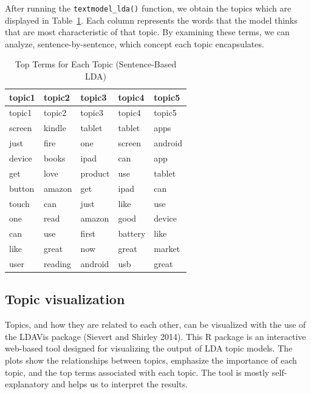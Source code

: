 After running the \texttt{textmodel\_lda()} function, we obtain the topics which are displayed in
Table~\ref{tbl-sentence_based_lda2}. Each column represents the words
that the model thinks that are most characteristic of that
topic. By examining these terms, we can analyze, sentence-by-sentence, which concept each topic
encapsulates.

\begin{longtable}[]{@{}lllll@{}}
\caption{Top Terms for Each Topic (Sentence-Based
LDA)}\label{tbl-sentence_based_lda2}\tabularnewline
\toprule\noalign{}
topic1 & topic2 & topic3 & topic4 & topic5 \\
\midrule\noalign{}
\endfirsthead
\toprule\noalign{}
topic1 & topic2 & topic3 & topic4 & topic5 \\
\midrule\noalign{}
\endhead
\bottomrule\noalign{}
\endlastfoot
screen & kindle & tablet & tablet & apps \\
just & fire & one & screen & android \\
device & books & ipad & can & app \\
get & love & product & use & tablet \\
button & amazon & get & ipad & can \\
touch & can & just & like & use \\
one & read & amazon & good & device \\
can & use & first & battery & like \\
like & great & now & great & market \\
user & reading & android & usb & great \\
\end{longtable}

\subsection{Topic visualization}\label{topics-visualization}

Topics, and how they are related to each other, can be visualized with the use of the
LDAVis package (Sievert and Shirley 2014). This R package is an
interactive web-based tool designed for visualizing the output of LDA topic models. The plots show the relationships between
topics, emphasize the importance of each topic, and the top terms
associated with each topic. The tool is mostly self-explanatory and
helps us to interpret the results.


